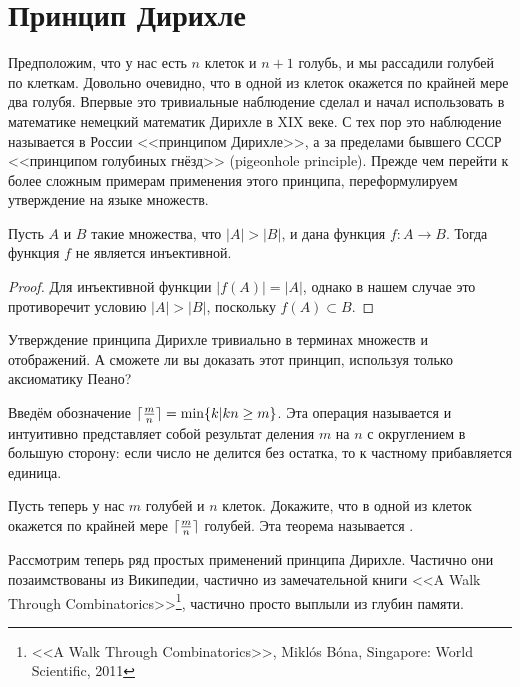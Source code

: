 \section{Принцип Дирихле}

Предположим, что у нас есть $n$ клеток и $n+1$ голубь, и мы рассадили голубей по клеткам. Довольно очевидно, что в одной из клеток окажется по крайней мере два голубя. Впервые это тривиальные наблюдение сделал и начал использовать в математике немецкий математик Дирихле в XIX веке. С тех пор это наблюдение называется в России <<принципом Дирихле>>, а за пределами бывшего СССР <<принципом голубиных гнёзд>> (pigeonhole principle). Прежде чем перейти к более сложным примерам применения этого принципа, переформулируем утверждение на языке множеств.

\begin{thm}
Пусть $A$ и $B$ такие множества, что $|A|>|B|$, и дана функция $f:A\to B$. Тогда функция $f$ не является инъективной.
\end{thm}
\begin{proof}
Для инъективной функции $|f(A)| = |A|$, однако в нашем случае это противоречит условию $|A|>|B|$, поскольку $f(A)\subset B$.
\end{proof}

\begin{exercise}
Утверждение принципа Дирихле тривиально в терминах множеств и отображений. А сможете ли вы доказать этот принцип, используя только аксиоматику Пеано?
\end{exercise}

Введём обозначение $\lceil {m\over n} \rceil = \min\{k|kn\ge m\}$. Эта операция называется  и интуитивно представляет собой результат деления $m$ на $n$ с округлением в большую сторону: если число не делится без остатка, то к частному прибавляется единица.

\begin{exercise}
Пусть теперь у нас $m$ голубей и $n$ клеток. Докажите, что в одной из клеток окажется по крайней мере $\lceil{m\over n}\rceil$ голубей. Эта теорема называется .
\end{exercise}

Рассмотрим теперь ряд простых применений принципа Дирихле. Частично они позаимствованы из Википедии, частично из замечательной книги <<A Walk Through Combinatorics>>\footnote{<<A Walk Through Combinatorics>>, Miklós Bóna, Singapore: World Scientific, 2011}, частично просто выплыли из глубин памяти.

